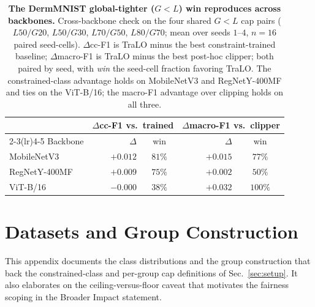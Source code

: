\documentclass[10pt]{article}
\begin{document}
\begin{table}[t]\centering\small
\setlength{\tabcolsep}{5pt}
\caption{\textbf{The DermMNIST global-tighter ($G{<}L$) win reproduces
across backbones.} Cross-backbone check on the four shared $G{<}L$
cap pairs ($L50/G20$, $L50/G30$, $L70/G50$, $L80/G70$; mean over
seeds $1$--$4$, $n{=}16$ paired seed-cells). $\Delta$cc-F1 is TraLO
minus the best constraint-trained baseline; $\Delta$macro-F1 is TraLO
minus the best post-hoc clipper; both paired by seed, with \emph{win}
the seed-cell fraction favoring TraLO. The constrained-class advantage
holds on MobileNetV3 and RegNet{Y-400MF} and ties on the ViT{-B/16}; the macro-F1
advantage over clipping holds on all three.}
\label{tab:asym_xbackbone}
\setlength{\tabcolsep}{4pt}\small
\begin{tabular}{l rc rc}
\toprule
 & \multicolumn{2}{c}{$\Delta$cc-F1 vs.\ trained} & \multicolumn{2}{c}{$\Delta$macro-F1 vs.\ clipper} \\
\cmidrule(lr){2-3}\cmidrule(lr){4-5}
Backbone & $\Delta$ & win & $\Delta$ & win \\
\midrule
MobileNetV3    & $+0.012$ & $81\%$  & $+0.015$ & $77\%$ \\
RegNetY-400MF  & $+0.009$ & $75\%$  & $+0.002$ & $50\%$ \\
ViT-B/16       & $-0.000$ & $38\%$  & $+0.032$ & $100\%$ \\
\bottomrule
\end{tabular}
\end{table}

{}
{}
{}
% 

\section{Datasets and Group Construction}
\label{app:groups}

This appendix documents the class distributions and the group
construction that back the constrained-class and per-group cap
definitions of Sec.~\ref{sec:setup}. It also elaborates on the
ceiling-versus-floor caveat that motivates the fairness scoping in the
Broader Impact statement.
\end{document}
